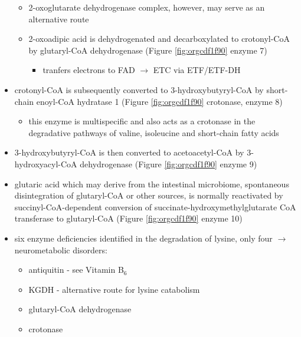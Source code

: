 \documentclass{scrartcl}
\begin{document}
\begin{itemize}
\begin{itemize}
\item 2-oxoglutarate dehydrogenase complex, however, may serve as an
alternative route

\item 2-oxoadipic acid is dehydrogenated and decarboxylated to
crotonyl-CoA by glutaryl-CoA dehydrogenase (Figure \ref{fig:orgcdf1f90} enzyme 7)
\begin{itemize}
\item tranfers electrons to FAD \(\to\) ETC via ETF/ETF-DH
\end{itemize}
\end{itemize}

\item crotonyl-CoA is subsequently converted to 3-hydroxybutyryl-CoA by
short-chain enoyl-CoA hydratase 1 (Figure \ref{fig:orgcdf1f90} crotonase, enzyme 8)
\begin{itemize}
\item this enzyme is multispecific and also acts as a crotonase in the
degradative pathways of valine, isoleucine and short-chain fatty
acids
\end{itemize}

\item 3-hydroxybutyryl-CoA is then converted to acetoacetyl-CoA by
3-hydroxyacyl-CoA dehydrogenase (Figure \ref{fig:orgcdf1f90} enzyme 9)
\item glutaric acid which may derive from the intestinal microbiome,
spontaneous disintegration of glutaryl-CoA or other sources, is
normally reactivated by succinyl-CoA-dependent conversion of
succinate-hydroxymethylglutarate CoA transferase to glutaryl-CoA
(Figure \ref{fig:orgcdf1f90} enzyme 10)

\item six enzyme deficiencies identified in the degradation of lysine,
only four \(\to\) neurometabolic disorders:
\begin{itemize}
\item antiquitin - see Vitamin B\(_{\text{6}}\)
\item KGDH - alternative route for lysine catabolism
\item glutaryl-CoA dehydrogenase
\item crotonase
\end{itemize}
\end{itemize}
\end{document}
